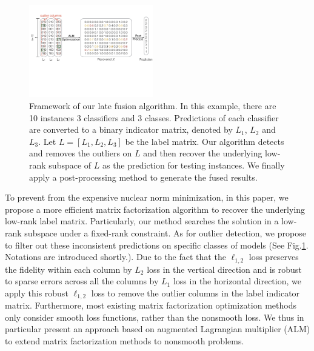 \documentclass[10pt,twocolumn,letterpaper]{article}
\def\calC{{\mathcal{C}}}
\begin{document}
\begin{figure}[!t]
\begin{center}
\includegraphics[width=0.48\textwidth]{resource/frame_work.pdf}
\end{center}
\caption{Framework of our late fusion algorithm.
In this example, there are 10 instances 3 classifiers and 3 classes.
Predictions of each classifier are converted to a binary indicator matrix,
denoted by $L_1$, $L_2$ and $L_3$.
Let $L = [L_1, L_2, L_3]$ be the label matrix.
Our algorithm detects and removes the outliers on $L$ and then recover the underlying low-rank subspace of $L$ as the prediction for testing instances.
We finally apply a post-processing method to generate the fused results.
}
\label{fig:framework}
\end{figure}

To prevent from the expensive nuclear norm minimization,
in this paper, we propose a more efficient matrix factorization algorithm to recover the underlying low-rank label matrix.
Particularly, our method searches the solution in a low-rank subspace under a fixed-rank constraint.
As for outlier detection,
we propose to filter out these inconsistent predictions on specific classes of models (See Fig.\ref{fig:framework}.
Notations are introduced shortly.).
Due to the fact that the $\ell_{1,2}$ loss preserves the fidelity within each column by $L_2$ loss in the vertical direction and is robust to sparse errors across all the columns by $L_1$ loss in the horizontal direction,
we apply this robust $\ell_{1,2}$ loss to remove the outlier columns in the label indicator matrix.
Furthermore, most existing matrix factorization optimization methods only consider smooth loss functions, rather than the nonsmooth loss.
We thus in particular present an approach based on augmented Lagrangian multiplier (ALM) to extend matrix factorization methods to nonsmooth problems.
\end{document}
